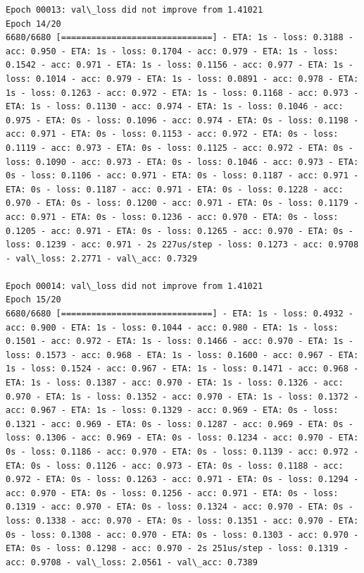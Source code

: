 \documentclass[11pt]{article}
\begin{document}
\begin{Verbatim}[commandchars=\\\{\}]
Epoch 00013: val\_loss did not improve from 1.41021
Epoch 14/20
6680/6680 [==============================] - ETA: 1s - loss: 0.3188 - acc: 0.950 - ETA: 1s - loss: 0.1704 - acc: 0.979 - ETA: 1s - loss: 0.1542 - acc: 0.971 - ETA: 1s - loss: 0.1156 - acc: 0.977 - ETA: 1s - loss: 0.1014 - acc: 0.979 - ETA: 1s - loss: 0.0891 - acc: 0.978 - ETA: 1s - loss: 0.1263 - acc: 0.972 - ETA: 1s - loss: 0.1168 - acc: 0.973 - ETA: 1s - loss: 0.1130 - acc: 0.974 - ETA: 1s - loss: 0.1046 - acc: 0.975 - ETA: 0s - loss: 0.1096 - acc: 0.974 - ETA: 0s - loss: 0.1198 - acc: 0.971 - ETA: 0s - loss: 0.1153 - acc: 0.972 - ETA: 0s - loss: 0.1119 - acc: 0.973 - ETA: 0s - loss: 0.1125 - acc: 0.972 - ETA: 0s - loss: 0.1090 - acc: 0.973 - ETA: 0s - loss: 0.1046 - acc: 0.973 - ETA: 0s - loss: 0.1106 - acc: 0.971 - ETA: 0s - loss: 0.1187 - acc: 0.971 - ETA: 0s - loss: 0.1187 - acc: 0.971 - ETA: 0s - loss: 0.1228 - acc: 0.970 - ETA: 0s - loss: 0.1200 - acc: 0.971 - ETA: 0s - loss: 0.1179 - acc: 0.971 - ETA: 0s - loss: 0.1236 - acc: 0.970 - ETA: 0s - loss: 0.1205 - acc: 0.971 - ETA: 0s - loss: 0.1265 - acc: 0.970 - ETA: 0s - loss: 0.1239 - acc: 0.971 - 2s 227us/step - loss: 0.1273 - acc: 0.9708 - val\_loss: 2.2771 - val\_acc: 0.7329

Epoch 00014: val\_loss did not improve from 1.41021
Epoch 15/20
6680/6680 [==============================] - ETA: 1s - loss: 0.4932 - acc: 0.900 - ETA: 1s - loss: 0.1044 - acc: 0.980 - ETA: 1s - loss: 0.1501 - acc: 0.972 - ETA: 1s - loss: 0.1466 - acc: 0.970 - ETA: 1s - loss: 0.1573 - acc: 0.968 - ETA: 1s - loss: 0.1600 - acc: 0.967 - ETA: 1s - loss: 0.1524 - acc: 0.967 - ETA: 1s - loss: 0.1471 - acc: 0.968 - ETA: 1s - loss: 0.1387 - acc: 0.970 - ETA: 1s - loss: 0.1326 - acc: 0.970 - ETA: 1s - loss: 0.1352 - acc: 0.970 - ETA: 1s - loss: 0.1372 - acc: 0.967 - ETA: 1s - loss: 0.1329 - acc: 0.969 - ETA: 0s - loss: 0.1321 - acc: 0.969 - ETA: 0s - loss: 0.1287 - acc: 0.969 - ETA: 0s - loss: 0.1306 - acc: 0.969 - ETA: 0s - loss: 0.1234 - acc: 0.970 - ETA: 0s - loss: 0.1186 - acc: 0.970 - ETA: 0s - loss: 0.1139 - acc: 0.972 - ETA: 0s - loss: 0.1126 - acc: 0.973 - ETA: 0s - loss: 0.1188 - acc: 0.972 - ETA: 0s - loss: 0.1263 - acc: 0.971 - ETA: 0s - loss: 0.1294 - acc: 0.970 - ETA: 0s - loss: 0.1256 - acc: 0.971 - ETA: 0s - loss: 0.1319 - acc: 0.970 - ETA: 0s - loss: 0.1324 - acc: 0.970 - ETA: 0s - loss: 0.1338 - acc: 0.970 - ETA: 0s - loss: 0.1351 - acc: 0.970 - ETA: 0s - loss: 0.1308 - acc: 0.970 - ETA: 0s - loss: 0.1303 - acc: 0.970 - ETA: 0s - loss: 0.1298 - acc: 0.970 - 2s 251us/step - loss: 0.1319 - acc: 0.9708 - val\_loss: 2.0561 - val\_acc: 0.7389


\end{Verbatim}
\end{document}
